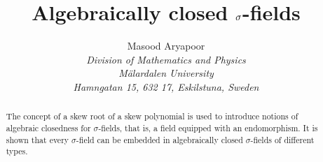 \documentclass[11pt,a4paper]{article}
\title{Algebraically closed $\s$-fields}
\author{Masood Aryapoor\\
\tiny{\textit{Division of Mathematics and Physics}}\\
\tiny{\textit{M\"{a}lardalen  University}}\\
\tiny{\textit{Hamngatan 15, 632 17, Eskilstuna, 
Sweden
}}

}
\date{}
\theoremstyle{theorem}
\numberwithin{equation}{section}
\newcommand{\s}{\sigma}
\begin{document}
 \maketitle
\begin{abstract}
\noindent
The concept of a skew root of a skew polynomial is used to introduce notions of algebraic closedness for $\s$-fields, that is, a field equipped with an endomorphism. It is shown that every $\s$-field can be embedded in algebraically closed $\s$-fields of different types.     \\
\end{abstract}
\end{document}
